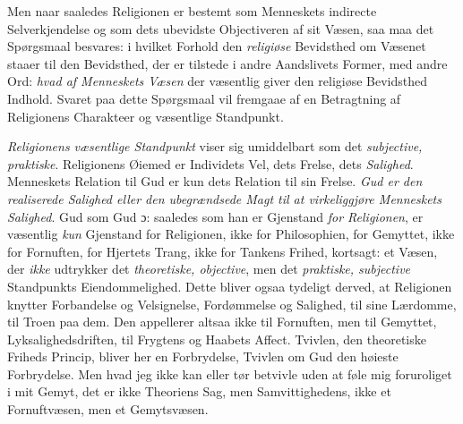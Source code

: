 Men naar saaledes Religionen er bestemt som Menneskets indirecte
Selverkjendelse og som dets ubevidste Objectiveren af sit Væsen, saa maa det
Spørgsmaal besvares: i hvilket Forhold den \emph{religiøse} Bevidsthed om Væsenet
staaer til den Bevidsthed, der er tilstede i andre Aandslivets Former, med
andre Ord: \emph{hvad af Menneskets Væsen} der væsentlig giver den religiøse
Bevidsthed Indhold.
Svaret paa dette Spørgsmaal vil fremgaae af en Betragtning af Religionens
Charakteer og væsentlige Standpunkt.

\emph{Religionens væsentlige Standpunkt} viser sig umiddelbart som det
\emph{subjective, praktiske}. Religionens Øiemed er Individets Vel, dets Frelse,
dets \emph{Salighed}. Menneskets Relation til Gud er kun dets Relation til sin
Frelse. \emph{Gud er den realiserede Salighed eller den ubegrændsede Magt til at
virkeliggjøre Menneskets Salighed}. Gud som Gud ɔ: saaledes som han er
Gjenstand \emph{for Religionen}, er væsentlig \emph{kun} Gjenstand for Religionen,
ikke for Philosophien, for Gemyttet, ikke for Fornuften, for Hjertets Trang,
ikke for Tankens Frihed, kortsagt: et Væsen, der \emph{ikke} udtrykker det
\emph{theoretiske, objective}, men det \emph{praktiske, subjective} Standpunkts
Eiendommelighed. Dette bliver ogsaa tydeligt derved, at Religionen knytter
Forbandelse og Velsignelse, Fordømmelse og Salighed, til sine Lærdomme, til
Troen paa dem. Den appellerer altsaa ikke til Fornuften, men til Gemyttet,
Lyksalighedsdriften, til Frygtens og Haabets Affect. Tvivlen, den theoretiske
Friheds Princip, bliver her en Forbrydelse, Tvivlen om Gud den høieste
Forbrydelse. Men hvad jeg ikke kan eller tør betvivle uden at føle mig
foruroliget i mit Gemyt, det er ikke Theoriens Sag, men Samvittighedens, ikke
et Fornuftvæsen, men et Gemytsvæsen.

